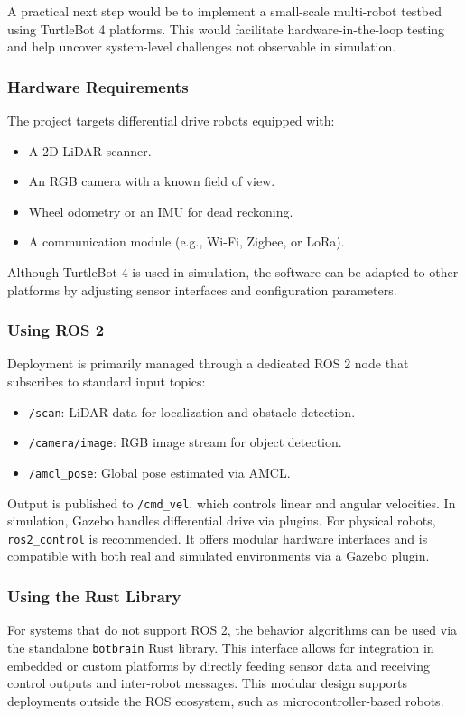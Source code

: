 A practical next step would be to implement a small-scale multi-robot testbed using TurtleBot 4 platforms. This would facilitate hardware-in-the-loop testing and help uncover system-level challenges not observable in simulation.

\subsubsection{Hardware Requirements}
The project targets differential drive robots equipped with:
\begin{itemize}
  \item A 2D LiDAR scanner.
  \item An RGB camera with a known field of view.
  \item Wheel odometry or an IMU for dead reckoning.
  \item A communication module (e.g., Wi-Fi, Zigbee, or LoRa).
\end{itemize}
Although TurtleBot 4 is used in simulation, the software can be adapted to other platforms by adjusting sensor interfaces and configuration parameters.

\subsubsection{Using ROS 2}
Deployment is primarily managed through a dedicated ROS 2 node that subscribes to standard input topics:
\begin{itemize}
  \item \texttt{/scan}: LiDAR data for localization and obstacle detection.
  \item \texttt{/camera/image}: RGB image stream for object detection.
  \item \texttt{/amcl\_pose}: Global pose estimated via AMCL.
\end{itemize}

Output is published to \texttt{/cmd\_vel}, which controls linear and angular velocities. In simulation, Gazebo handles differential drive via plugins. For physical robots, \texttt{ros2\_control} \cite{ros2-control} is recommended. It offers modular hardware interfaces and is compatible with both real and simulated environments via a Gazebo plugin.

\subsubsection{Using the Rust Library}
For systems that do not support ROS 2, the behavior algorithms can be used via the standalone \texttt{botbrain} Rust library. This interface allows for integration in embedded or custom platforms by directly feeding sensor data and receiving control outputs and inter-robot messages. This modular design supports deployments outside the ROS ecosystem, such as microcontroller-based robots.


